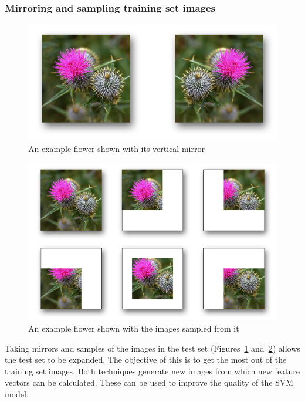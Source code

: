 \documentclass[11pt, a4paper]{report}
\begin{document}
\subsubsection{Mirroring and sampling training set images}

\begin{figure}[hbt]
	\centering
  \includegraphics[totalheight=4cm]{img/09.png}
  \caption{An example flower shown with its vertical mirror}
  \label{img:09}
\end{figure}

\begin{figure}[hbt]
	\centering
  \includegraphics[totalheight=8cm]{img/10.png}
  \caption{An example flower shown with the images sampled from it}
  \label{img:10}
\end{figure}

Taking mirrors and samples of the images in the test set (Figures~\ref{img:09} and~\ref{img:10}) allows the test set to be expanded. The objective of this is to get the most out of the training set images. Both techniques generate new images from which new feature vectors can be calculated. These can be used to improve the quality of the SVM model. 
\end{document}

